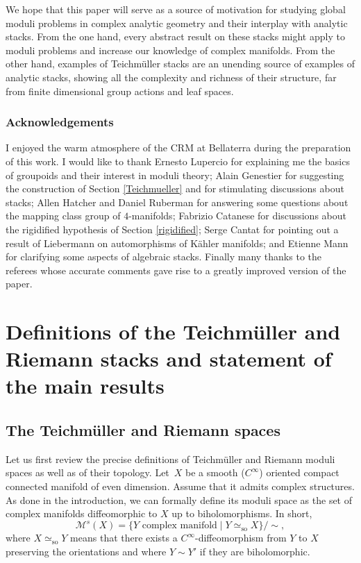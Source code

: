 \documentclass[JEP,XML,SOM,Unicode]{cedram}
\let\mathcal\mathscr
\newcommand{\so}{\mathrm{so}}
\theoremstyle{plain}
\theoremstyle{definition}
\theoremstyle{remark}
\numberwithin{equation}{section}
\begin{document}
We hope that this paper will serve as a source of motivation for studying global moduli problems in complex analytic geometry and their interplay with analytic stacks. From the one hand, every abstract result on these stacks might apply to moduli problems and increase our knowledge of complex manifolds. From the other hand, examples of Teichmüller stacks are an unending source of examples of analytic stacks, showing all the complexity and richness of their structure, far from finite dimensional group actions and leaf spaces.

\subsubsection*{Acknowledgements}
I enjoyed the warm atmosphere of the CRM at Bellaterra during the preparation of this work. I would like to thank Ernesto Lupercio for explaining me the basics of groupoids and their interest in moduli theory; Alain Genestier for suggesting the construction of Section \ref{Teichmueller} and for stimulating discussions about stacks; Allen Hatcher and Daniel Ruberman for answering some questions about the mapping class group of $4$-manifolds; Fabrizio Catanese for discussions about the rigidified hypothesis of Section \ref{rigidified}; Serge Cantat for pointing out a result of Liebermann on automorphisms of Kähler manifolds; and Etienne Mann for clarifying some aspects of algebraic stacks. Finally many thanks to the referees whose accurate comments gave rise to a greatly improved version of the paper.

\section{Definitions of the Teichmüller and Riemann stacks and statement of the main results}
\label{notations}

\subsection{The Teichmüller and Riemann spaces}
\label{TRspaces}
Let us first review the precise definitions of Teichmüller and Riemann moduli spaces as well as of their topology. Let~$X$ be a smooth (\ie $C^\infty$) oriented compact connected manifold of even dimension. Assume that it admits complex structures. As done in the introduction, we can formally define its moduli space as the set of complex manifolds diffeomorphic to $X$ up to biholomorphisms. In short,
\begin{equation}
\label{M}
\mathcal M^s(X)=\{Y\text{ complex manifold}\mid Y\simeq_{\so} X\}/\sim,
\end{equation}
where $X\simeq_{\so}Y$ means that there exists a $C^\infty$-diffeomorphism from $Y$ to $X$ preserving the orientations and where $Y\sim Y'$ if they are biholomorphic.
\end{document}

